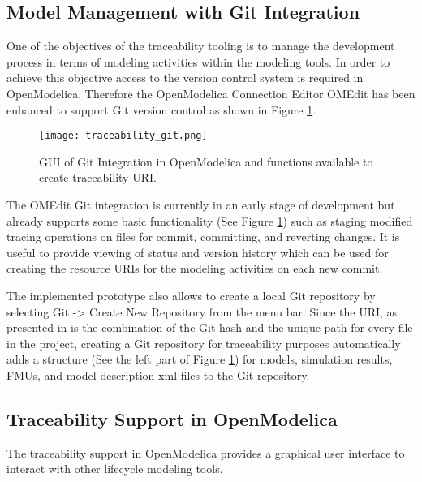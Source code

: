 \subsection{Model Management with Git Integration}
\label{sec:tracaebilitygit}

One of the objectives of the traceability tooling is to manage the development process in terms of modeling
activities within the modeling tools. In order to achieve this objective access to the version control system is
required in OpenModelica. Therefore the OpenModelica Connection Editor OMEdit has been enhanced to support Git version 
control as shown in Figure \ref{fig:traceabilitygit}.

\begin{figure}
	\texttt{[image: traceability\_git.png]}
	\caption{GUI of Git Integration in OpenModelica and functions available to create traceability URI.}
	\label{fig:traceabilitygit}
\end{figure}

The OMEdit Git integration is currently in an early stage of development but already supports some basic
functionality (See Figure \ref{fig:traceabilitygit}) such as staging modified tracing operations on files 
for commit, committing, and reverting changes. It is useful to provide viewing of status and version history 
which can be used for creating the resource URIs for the modeling activities on each new commit.

The implemented prototype also allows to create a local Git repository by selecting Git -> Create New Repository from the menu bar. 
Since the URI, as presented in \cite{intocpsjohn} is the combination of the Git-hash and the unique path for every file in the
project, creating a Git repository for traceability purposes automatically adds a structure (See the left
part of Figure \ref{fig:traceabilitygit}) for models, simulation results, FMUs, and model description \acrshort{xml} files to the Git repository.

\subsection{Traceability Support in OpenModelica}
\label{ssec:traceabilityopenmodelica}

The traceability support in OpenModelica provides a graphical user interface to interact with other lifecycle
modeling tools.

